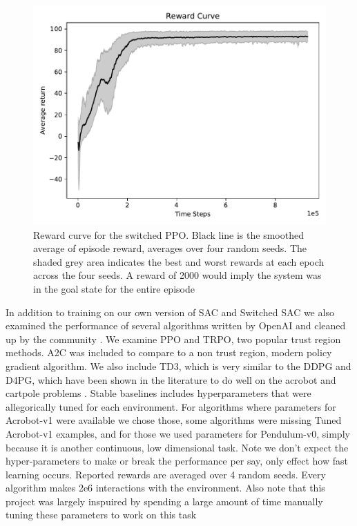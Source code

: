 \documentclass[letterpaper, 10 pt, conference]{ieeeconf}
\begin{document}
 \begin{figure}[h]
\centering
  \includegraphics[scale=.5]{reward_curve.pdf}
  \caption{Reward curve for the switched PPO. Black line is the smoothed average of episode reward, averages over four random seeds. The shaded grey area indicates the best and worst rewards at each epoch across the four seeds. A reward of 2000 would imply the system was in the goal state for the entire episode}
  \label{fig:switched_reward}
\end{figure}

In addition to training on our own version of SAC and Switched SAC we also examined the performance of several algorithms written by OpenAI and cleaned up by the community \cite{stable_baselines}. We examine PPO and TRPO, two popular trust region methods. A2C was included to compare to a non trust region, modern policy gradient algorithm. We also include TD3, which is very similar to the DDPG and D4PG, which have been shown in the literature to do well on the acrobot and cartpole problems \cite{lillicrap_continuous_2015} \cite{deepmindcontrolsuite2018}. 
Stable baselines includes hyperparameters that were allegorically tuned for each environment. For algorithms where parameters for Acrobot-v1  were available we chose those, some algorithms were missing Tuned Acrobot-v1 examples, and for those we used parameters for Pendulum-v0, simply because it is another continuous, low dimensional task. Note we don't expect the hyper-parameters to make or break the performance per say, only effect how fast learning occurs. Reported rewards are averaged over 4 random seeds. Every algorithm makes 2e6 interactions with the environment. Also note that this project was largely inspuired by spending a large amount of time manually tuning these parameters to work on this task
\end{document}
